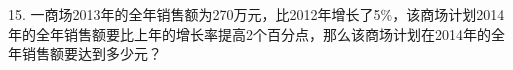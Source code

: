 15.	一商场2013年的全年销售额为270万元，比2012年增长了5$\%$，该商场计划2014年的全年销售额要比上年的增长率提高2个百分点，那么该商场计划在2014年的全年销售额要达到多少元？



